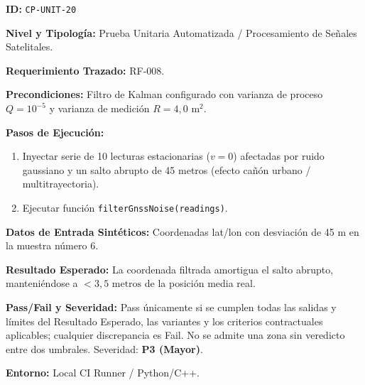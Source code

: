 \par\noindent\textbf{ID:} \texttt{C\allowbreak{}P\allowbreak{}-\allowbreak{}U\allowbreak{}N\allowbreak{}I\allowbreak{}T\allowbreak{}-\allowbreak{}2\allowbreak{}0\allowbreak{}}\par
\par\noindent\textbf{Nivel y Tipología:} Prueba Unitaria Automatizada / Procesamiento de Señales Satelitales.\par
\par\noindent\textbf{Requerimiento Trazado:} RF-008.\par
\par\noindent\textbf{Precondiciones:} Filtro de Kalman configurado con varianza de proceso \(Q = 10^{-5}\) y varianza de medición \(R = 4{,}0\text{ m}^2\).\par
\par\noindent\textbf{Pasos de Ejecución:} \par
\begin{enumerate}
\item Inyectar serie de 10 lecturas estacionarias (\(v = 0\)) afectadas por ruido gaussiano y un salto abrupto de 45 metros (efecto cañón urbano / multitrayectoria).
\item Ejecutar función \texttt{f\allowbreak{}i\allowbreak{}l\allowbreak{}t\allowbreak{}e\allowbreak{}r\allowbreak{}G\allowbreak{}n\allowbreak{}s\allowbreak{}s\allowbreak{}N\allowbreak{}o\allowbreak{}i\allowbreak{}s\allowbreak{}e\allowbreak{}(\allowbreak{}r\allowbreak{}e\allowbreak{}a\allowbreak{}d\allowbreak{}i\allowbreak{}n\allowbreak{}g\allowbreak{}s\allowbreak{})\allowbreak{}}.
\end{enumerate}
\par\noindent\textbf{Datos de Entrada Sintéticos:} Coordenadas lat/lon con desviación de 45 m en la muestra número 6.\par
\par\noindent\textbf{Resultado Esperado:} La coordenada filtrada amortigua el salto abrupto, manteniéndose a \(< 3{,}5\text{ metros}\) de la posición media real.\par
\par\noindent\textbf{Pass/Fail y Severidad:} Pass únicamente si se cumplen todas las salidas y límites del Resultado Esperado, las variantes y los criterios contractuales aplicables; cualquier discrepancia es Fail. No se admite una zona sin veredicto entre dos umbrales. Severidad: \textbf{P3 (Mayor)}.\par
\par\noindent\textbf{Entorno:} Local CI Runner / Python/C++.\par






